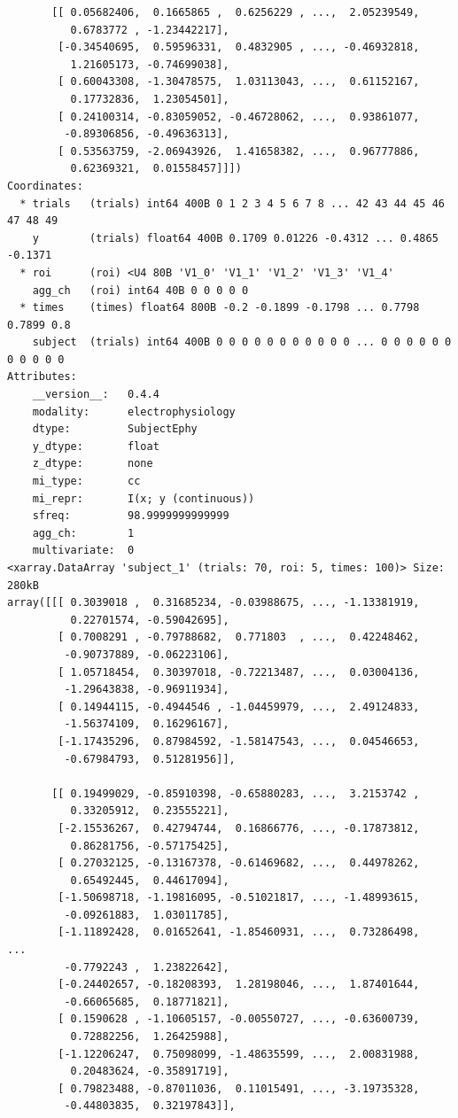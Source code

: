 \documentclass[
  11pt,
  letterpaper,
  oneside,
  openany]{book}
\begin{document}
\begin{verbatim}
       [[ 0.05682406,  0.1665865 ,  0.6256229 , ...,  2.05239549,
          0.6783772 , -1.23442217],
        [-0.34540695,  0.59596331,  0.4832905 , ..., -0.46932818,
          1.21605173, -0.74699038],
        [ 0.60043308, -1.30478575,  1.03113043, ...,  0.61152167,
          0.17732836,  1.23054501],
        [ 0.24100314, -0.83059052, -0.46728062, ...,  0.93861077,
         -0.89306856, -0.49636313],
        [ 0.53563759, -2.06943926,  1.41658382, ...,  0.96777886,
          0.62369321,  0.01558457]]])
Coordinates:
  * trials   (trials) int64 400B 0 1 2 3 4 5 6 7 8 ... 42 43 44 45 46 47 48 49
    y        (trials) float64 400B 0.1709 0.01226 -0.4312 ... 0.4865 -0.1371
  * roi      (roi) <U4 80B 'V1_0' 'V1_1' 'V1_2' 'V1_3' 'V1_4'
    agg_ch   (roi) int64 40B 0 0 0 0 0
  * times    (times) float64 800B -0.2 -0.1899 -0.1798 ... 0.7798 0.7899 0.8
    subject  (trials) int64 400B 0 0 0 0 0 0 0 0 0 0 0 ... 0 0 0 0 0 0 0 0 0 0 0
Attributes:
    __version__:   0.4.4
    modality:      electrophysiology
    dtype:         SubjectEphy
    y_dtype:       float
    z_dtype:       none
    mi_type:       cc
    mi_repr:       I(x; y (continuous))
    sfreq:         98.9999999999999
    agg_ch:        1
    multivariate:  0
<xarray.DataArray 'subject_1' (trials: 70, roi: 5, times: 100)> Size: 280kB
array([[[ 0.3039018 ,  0.31685234, -0.03988675, ..., -1.13381919,
          0.22701574, -0.59042695],
        [ 0.7008291 , -0.79788682,  0.771803  , ...,  0.42248462,
         -0.90737889, -0.06223106],
        [ 1.05718454,  0.30397018, -0.72213487, ...,  0.03004136,
         -1.29643838, -0.96911934],
        [ 0.14944115, -0.4944546 , -1.04459979, ...,  2.49124833,
         -1.56374109,  0.16296167],
        [-1.17435296,  0.87984592, -1.58147543, ...,  0.04546653,
         -0.67984793,  0.51281956]],

       [[ 0.19499029, -0.85910398, -0.65880283, ...,  3.2153742 ,
          0.33205912,  0.23555221],
        [-2.15536267,  0.42794744,  0.16866776, ..., -0.17873812,
          0.86281756, -0.57175425],
        [ 0.27032125, -0.13167378, -0.61469682, ...,  0.44978262,
          0.65492445,  0.44617094],
        [-1.50698718, -1.19816095, -0.51021817, ..., -1.48993615,
         -0.09261883,  1.03011785],
        [-1.11892428,  0.01652641, -1.85460931, ...,  0.73286498,
...
         -0.7792243 ,  1.23822642],
        [-0.24402657, -0.18208393,  1.28198046, ...,  1.87401644,
         -0.66065685,  0.18771821],
        [ 0.1590628 , -1.10605157, -0.00550727, ..., -0.63600739,
          0.72882256,  1.26425988],
        [-1.12206247,  0.75098099, -1.48635599, ...,  2.00831988,
          0.20483624, -0.35891719],
        [ 0.79823488, -0.87011036,  0.11015491, ..., -3.19735328,
         -0.44803835,  0.32197843]],


\end{verbatim}
\end{document}
